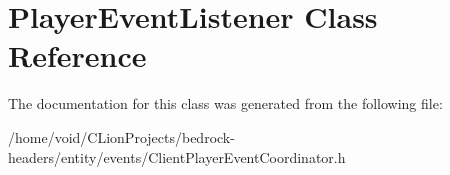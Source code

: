 \hypertarget{class_player_event_listener}{}\section{Player\+Event\+Listener Class Reference}
\label{class_player_event_listener}


The documentation for this class was generated from the following file\+:\begin{DoxyCompactItemize}
\item 
/home/void/\+C\+Lion\+Projects/bedrock-\/headers/entity/events/Client\+Player\+Event\+Coordinator.\+h\end{DoxyCompactItemize}
